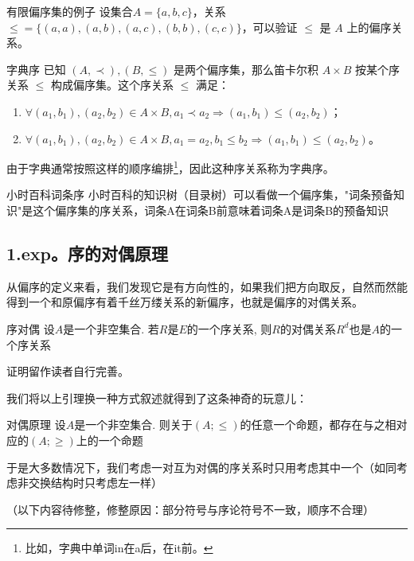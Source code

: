 \begin{example}{有限偏序集的例子}
设集合$A = \{a,b,c\}$，关系$\leq\!= \{(a,a),(a,b),(a,c),(b,b),(c,c)\}$，可以验证 $\leq$ 是 $A$ 上的偏序关系。
\end{example}

\begin{example}{字典序}\label{OrdRel_ex1}
已知 $(A,\prec),(B,\leq)$ 是两个偏序集，那么笛卡尔积 $A\times B$ 按某个序关系 $\leqslant$ 构成偏序集。这个序关系 $\leqslant$ 满足：
\begin{enumerate}
\item $\forall(a_1,b_1),(a_2,b_2) \in A\times B, a_1\prec a_2 \Rightarrow (a_1,b_1)\leqslant(a_2,b_2)$；
\item $\forall(a_1,b_1),(a_2,b_2) \in A\times B, a_1=a_2, b_1\leq b_2 \Rightarrow (a_1,b_1) \leqslant (a_2, b_2)$。
\end{enumerate}

由于字典通常按照这样的顺序编排\footnote{比如，字典中单词in在a后，在it前。}，因此这种序关系称为字典序。
\end{example}

\begin{example}{小时百科词条序}
小时百科的知识树（目录树）可以看做一个偏序集，"词条预备知识"是这个偏序集的序关系，词条A在词条B前意味着词条A是词条B的预备知识
\end{example}

\subsection{1.exp。序的对偶原理}
从偏序的定义来看，我们发现它是有方向性的，如果我们把方向取反，自然而然能得到一个和原偏序有着千丝万缕关系的新偏序，也就是偏序的对偶关系。

\begin{lemma}{序对偶}
  设$A$是一个非空集合. 若$R$是$E$的一个序关系, 则$R$的对偶关系$R^{d}$也是$A$的一个序关系
\end{lemma}
证明留作读者自行完善。

我们将以上引理换一种方式叙述就得到了这条神奇的玩意儿：
\begin{theorem}{对偶原理}
 设$A$是一个非空集合. 则关于$(A;\leq)$的任意一个命题，都存在与之相对应的$(A;\geq)$上的一个命题
\end{theorem}

于是大多数情况下，我们考虑一对互为对偶的序关系时只用考虑其中一个（如同考虑非交换结构时只考虑左一样）

（以下内容待修整，修整原因：部分符号与序论符号不一致，顺序不合理）
